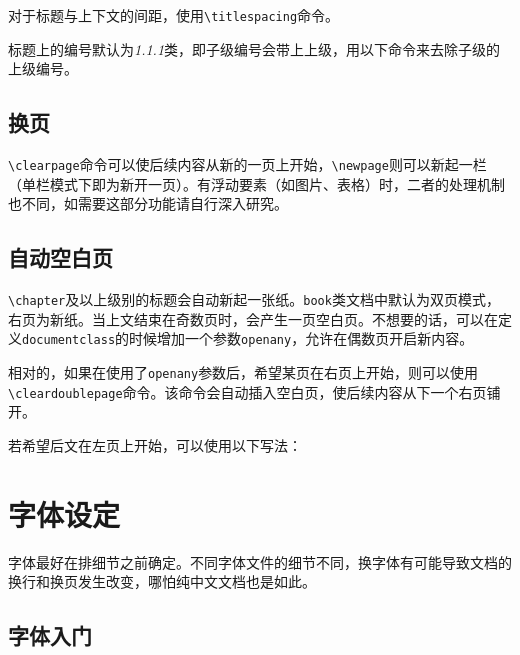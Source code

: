 \documentclass[10pt,openany]{book}
\begin{document}
\begin{sloppypar}
    

    对于标题与上下文的间距，使用\texttt{\textbackslash{}titlespacing}命令。

    

    标题上的编号默认为\emph{1.1.1}类，即子级编号会带上上级，用以下命令来去除子级的上级编号。

    

    \section{换页}

    \texttt{\textbackslash{}clearpage}命令可以使后续内容从新的一页上开始，\texttt{\textbackslash{}newpage}则可以新起一栏（单栏模式下即为新开一页）。有浮动要素（如图片、表格）时，二者的处理机制也不同，如需要这部分功能请自行深入研究。

    \section{自动空白页}

    \texttt{\textbackslash{}chapter}及以上级别的标题会自动新起一张纸。\texttt{book}类文档中默认为双页模式，右页为新纸。当上文结束在奇数页时，会产生一页空白页。不想要的话，可以在定义\texttt{documentclass}的时候增加一个参数\texttt{openany}，允许在偶数页开启新内容。

    

    相对的，如果在使用了\texttt{openany}参数后，希望某页在右页上开始，则可以使用\texttt{\textbackslash{}cleardoublepage}命令。该命令会自动插入空白页，使后续内容从下一个右页铺开。

    若希望后文在左页上开始，可以使用以下写法：

    

    \chapter{字体设定}

    字体最好在排细节之前确定。不同字体文件的细节不同，换字体有可能导致文档的换行和换页发生改变，哪怕纯中文文档也是如此。

    \section{字体入门}


\end{sloppypar}
\end{document}
